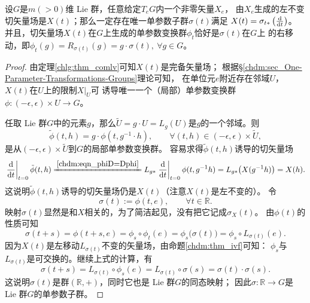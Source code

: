 \begin{theorem}
    设$G$是$m(>0)$维 Lie 群，任意给定$T_e G$内一个非零矢量$X_e$，
    由$X_e$生成的左不变切矢量场是$X(t)$；那么一定存在唯一单参数子群$\sigma(t)$满足
     $X(t)=\sigma_{t*}\left(\frac{\dd }{\dd t}\right)$。
    并且，切矢量场$X(t)$在$G$上生成的单参数变换群$\phi_t$恰好是$\sigma(t)$在$G$上
    的右移动，即$\phi_t(g)=R_{\sigma(t)}(g)=g\cdot \sigma(t),\ \forall g\in G$。
\end{theorem}
\begin{proof}
    由定理\ref{chlg:thm_comlv}可知$X(t)$是完备矢量场；
根据\S\ref{chdm:sec_One-Parameter-Transformations-Groups}理论可知，
在单位元$e$附近存在邻域$U$，$X(t)$在$U$上的限制$X|_U$可
诱导唯一一个（局部）单参数变换群$\phi:(-\epsilon,\epsilon)\times U\to G$。

任取 Lie 群$G$中的元素$g$，那么$\tilde{U}=g\cdot U=L_g(U)$是$g$的一个邻域。则
\begin{equation}
    \tilde{\phi}(t,h)=g\cdot \phi(t,g^{-1}\cdot h),\qquad
    \forall (t,h)\in (-\epsilon,\epsilon)\times \tilde{U},
\end{equation}
是从$(-\epsilon,\epsilon)\times \tilde{U}$到$G$的局部单参数变换群。
容易求得$\tilde{\phi}(t,h)$诱导的切矢量场
\begin{equation}
    \left. \frac{\d }{\d t}\right|_{t=0}\tilde{\phi}(t,h)
    \xlongequal{\ref{chdm:eqn_phiD=Dphi}}
    L_{g*}\left. \frac{\d }{\d t}\right|_{t=0} \phi(t,g^{-1}h)
    =L_{g*} \bigl(X(g^{-1}h)\bigr) = X(h).
\end{equation}
这说明$\tilde{\phi}(t,h)$诱导的切矢量场仍是$X(t)$（注意$X(t)$是左不变的）。
令
\begin{equation}\label{chlg:eqn_opsi}
    \sigma(t) := \phi(t,e),\qquad \forall t\in \mathbb{R}.
\end{equation}
映射$\sigma(t)$显然是和$X$相关的，为了简洁起见，没有把它记成$\sigma_X(t)$。
由$\phi(t)$的性质可知
\begin{equation}
    \sigma(t+s)=\phi(t+s,e)=\phi_s \circ \phi_t(e) = \phi_s\bigl(\sigma(t)\bigr)
    = \phi_s\circ L_{\sigma(t)}(e) .
\end{equation}
因为$X(t)$是左移动$L_{\sigma(t)}$不变的矢量场，由命题\ref{chdm:thm_ivf}可知：
$\phi_s$与$L_{\sigma(t)}$是可交换的。继续上式的计算，有
\begin{equation}
    \sigma(t+s)=L_{\sigma(t)} \circ  \phi_s (e) =L_{\sigma(t)} \circ \sigma(s)
    =\sigma(t) \cdot \sigma(s) .
\end{equation}
这说明$\sigma(t)$是群$(\mathbb{R},+)$，同时它也是 Lie 群$G$的同态映射；
因此$\sigma:\mathbb{R}\to G$是 Lie 群$G$的单参数子群。


\end{proof}
